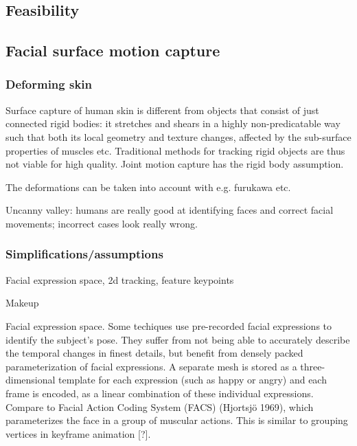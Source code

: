 %
%
%



\subsection{Feasibility}

\subsection{Facial surface motion capture} %

\subsubsection{Deforming skin}

Surface capture of human skin is different from objects that consist of just connected rigid bodies: it stretches and shears in a highly non-predicatable way such that both its local geometry and texture changes, affected by the sub-surface properties of muscles etc.
Traditional methods for tracking rigid objects are thus not viable for high quality.
Joint motion capture has the rigid body assumption.

The deformations can be taken into account with e.g. furukawa etc.

Uncanny valley: humans are really good at identifying faces and correct facial movements; incorrect cases look really wrong.

\subsubsection{Simplifications/assumptions}

Facial expression space, 2d tracking, feature keypoints

Makeup

Facial expression space. Some techiques \cite{faceshift,something} use pre-recorded facial expressions to identify the subject's pose.
They suffer from not being able to accurately describe the temporal changes in finest details, but benefit from densely packed parameterization of facial expressions.
A separate mesh is stored as a three-dimensional template for each expression (such as happy or angry) and each frame is encoded, as a linear combination of these individual expressions.
%
Compare to Facial Action Coding System (FACS) (Hjortsjö 1969), which parameterizes the face in a group of muscular actions. This is similar to grouping vertices in keyframe animation [?].
%
%

